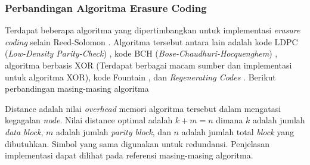 \subsubsection{Perbandingan Algoritma Erasure Coding}
Terdapat beberapa algoritma yang dipertimbangkan untuk implementasi \textit{erasure coding} selain Reed-Solomon \parencite{manasse2009reed}. Algoritma tersebut antara lain adalah kode LDPC (\textit{Low-Density Parity-Check}) \parencite{gallagher1962ldpc}, kode BCH (\textit{Bose-Chaudhuri-Hocquenghem}) \parencite{bose1960bch}, algoritma berbasis XOR (Terdapat berbagai macam sumber dan implementasi untuk algoritma XOR), kode Fountain \parencite{asteris2014fountain}, dan \textit{Regenerating Codes} \parencite{rashmi2012regenerating}. Berikut perbandingan masing-masing algoritma 

\begin{table}[ht]
    \centering
    \caption{Perbandingan algoritma erasure coding}
    \label{tab:ec-algorithm}
\end{table}

Distance adalah nilai \textit{overhead} memori algoritma tersebut dalam mengatasi kegagalan \textit{node}. Nilai distance optimal adalah $k + m = n$ dimana $k$ adalah jumlah \textit{data block}, $m$ adalah jumlah \textit{parity block}, dan $n$ adalah jumlah total \textit{block} yang dibutuhkan. Simbol yang sama digunakan untuk redundansi. Penjelasan implementasi dapat dilihat pada referensi masing-masing algoritma.

